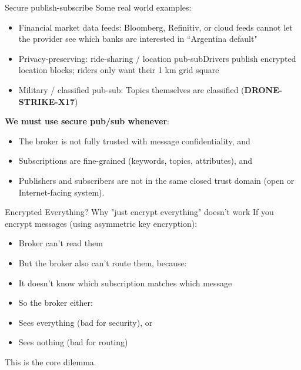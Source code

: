\begin{frame}{Secure publish-subscribe}
  Some real world examples:
  \begin{itemize}\tightlist
    \item Financial market data feeds: Bloomberg, Refinitiv, or cloud feeds cannot let the
          provider see which banks are interested in ``Argentina default"
    \item Privacy-preserving: ride-sharing / location pub-subDrivers publish encrypted location blocks;
          riders only want their 1 km grid square
    \item Military / classified pub-sub: Topics themselves are
          classified (\textbf{DRONE-STRIKE-X17})
  \end{itemize}
  \textbf{We must use secure pub/sub whenever}:
  \begin{itemize}\tightlist
    \item The broker is not fully trusted with message confidentiality, and
    \item Subscriptions are fine-grained (keywords, topics, attributes), and
    \item Publishers and subscribers are not in the same closed trust domain (open or Internet-facing system).
  \end{itemize}
\end{frame}

\begin{frame}{Encrypted Everything?}
  Why "just encrypt everything" doesn't work
  If you encrypt messages (using asymmetric key encryption):
  \begin{itemize}
    \item Broker can't read them
    \item But the broker also can't route them,
          because:
    \item It doesn't know which subscription matches
          which message
    \item So the broker either:
    \item Sees everything (bad for security), or
    \item Sees nothing (bad for routing)
  \end{itemize}
  This is the core dilemma.
\end{frame}

